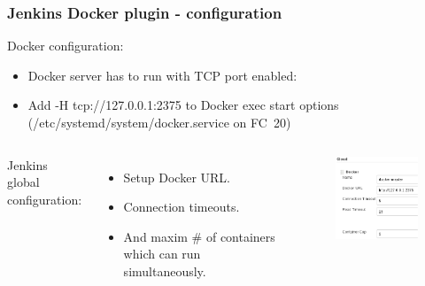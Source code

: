 \documentclass[10pt,utf8]{beamer}
\begin{document}
\begin{frame}
	\frametitle{Jenkins Docker plugin - configuration}
	Docker configuration:
	\begin{itemize}
		\item Docker server has to run with TCP port enabled:
		\item Add {{-H tcp://127.0.0.1:2375}} to Docker exec start options ({{/etc/systemd/system/docker.service}} on FC~20)
	\end{itemize}
	
	\begin{columns}
		Jenkins global configuration:
		\begin{itemize}
			\item Setup Docker URL.
			\vspace{0.5cm}
			\item Connection timeouts.
			\vspace{1cm}
			\item And maxim \# of containers which can run simultaneously.
		\end{itemize}
		
		\begin{figure}
			\centering
			\hspace{-1cm}
			\includegraphics[width=5cm]{./img/docker_plugin_cfg1.eps}
		\end{figure}
	\end{columns}
\end{frame}
\end{document}
